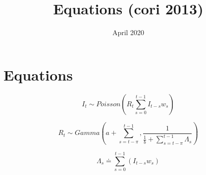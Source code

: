\documentclass{article}
\title{Equations (cori 2013)}
\date{April 2020}
\begin{document}
\section*{Equations}

\begin{equation}
    I_{t} \sim Poisson(R_{t} \sum_{s=0}^{t - 1} I_{t-s} w_{s})
\end{equation}

\begin{equation}
    R_{t} \sim Gamma( a + \sum_{s=t - \pi}^{t - 1}, \frac{1}{\frac{1}{b} + \sum_{s = t - \pi}^{t - 1}\Lambda_s})
    

\end{equation}

\begin{equation}
    \Lambda_s \doteq \sum_{s=0}^{t - 1} (I_{t-s} w_{s})
\end{equation}
\end{document}
